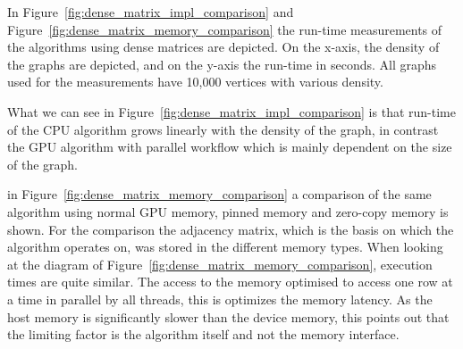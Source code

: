 \documentclass[letta4 paper]{article}
\numberwithin{equation}{section}
\newcommand{\0}{\mathbf{0}}
\begin{document}
In Figure~\ref{fig:dense_matrix_impl_comparison} and Figure~\ref{fig:dense_matrix_memory_comparison} the run-time measurements of the algorithms using dense matrices are depicted. On the x-axis, the density of the graphs are depicted, and on the y-axis the run-time in seconds. All graphs used for the measurements have 10,000 vertices with various density.

What we can see in Figure~\ref{fig:dense_matrix_impl_comparison} is that run-time of the CPU algorithm grows linearly with the density of the graph, in contrast the GPU algorithm with parallel workflow which is mainly dependent on the size of the graph. 

in Figure~\ref{fig:dense_matrix_memory_comparison} a comparison of the same algorithm using normal GPU memory, pinned memory and zero-copy memory is shown. For the comparison the adjacency matrix, which is the basis on which the algorithm operates on, was stored in the different memory types. When looking at the diagram of Figure~\ref{fig:dense_matrix_memory_comparison}, execution times are quite similar. The access to the memory optimised to access one row at a time in parallel by all threads, this is optimizes the memory latency. As the host memory is significantly slower than the device memory, this points out that the limiting factor is the algorithm itself and not the memory interface.
\end{document}

